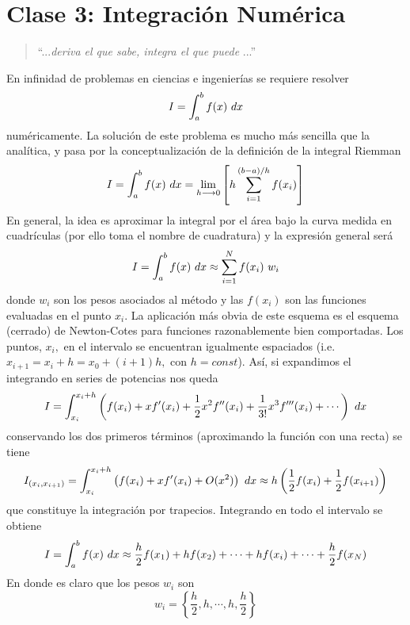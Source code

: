 \documentclass[spanish,titlepage,11pt]{article}
\begin{document}
\section{\textbf{Clase 3: }Integraci\'{o}n Num\'{e}rica}

\begin{quotation}
``...\textit{deriva el que sabe, integra el que puede} ...''
\end{quotation}

En infinidad de problemas en ciencias e ingenier\'{i}as se requiere resolver
\begin{equation}
I=\int_{a}^{b}f(x)\ {\normalsize d}x
\end{equation}
num\'{e}ricamente. La soluci\'{o}n de este problema es mucho m\'{a}s sencilla
que la anal\'{i}tica, y pasa por la conceptualizaci\'{o}n de la definici\'{o}n
de la integral Riemman
\begin{equation}
I=\int_{a}^{b}f(x)\ {\normalsize d}x=\lim_{h\longrightarrow0}\left[
h\sum_{i=1}^{\left(  b-a\right)  /h}f(x_{i})\right]
\end{equation}
En general, la idea es aproximar la integral por el \'{a}rea bajo la curva
medida en cuadr\'{i}culas (por ello toma el nombre de cuadratura) y la
expresi\'{o}n general ser\'{a}
\begin{equation}
I=\int_{a}^{b}f(x)\ {\normalsize d}x\approx\sum_{i=1}^{N}f(x_{i}%
)\ w_{i}\label{intaprox}%
\end{equation}
donde $w_{i}$ son los pesos asociados al m\'{e}todo y las $f(x_{i})$ son las
funciones evaluadas en el punto $x_{i}.$ La aplicaci\'{o}n m\'{a}s obvia de
este esquema es el esquema (cerrado) de Newton-Cotes para funciones
razonablemente bien comportadas. Los puntos, $x_{i},$ en el intervalo se
encuentran igualmente espaciados (i.e. $x_{i+1}=x_{i}+h=x_{0}+\left(
i+1\right)  h,$ con $h=const$). As\'{i}, si expandimos el integrando en series
de potencias nos queda
\begin{equation}
I=\int_{x_{i}}^{x_{i}+h}\left(  f(x_{i})+xf^{\prime}(x_{i})+\dfrac{1}{2}%
x^{2}f^{\prime\prime}(x_{i})+\dfrac{1}{3!}x^{3}f^{\prime\prime\prime}%
(x_{i})+\cdots\right)  \ {\normalsize d}x
\end{equation}
conservando los dos primeros t\'{e}rminos (aproximando la funci\'{o}n con una
recta) se tiene
\begin{equation}
I_{\left(  x_{i},x_{i+1}\right)  }=\int_{x_{i}}^{x_{i}+h}\left(
f(x_{i})+xf^{\prime}(x_{i})+O(x^{2})\right)  \ {\normalsize d}x\approx
h\left(  \dfrac{1}{2}f(x_{i})+\dfrac{1}{2}f(x_{i+1})\right)
\end{equation}
que constituye la integraci\'{o}n por trapecios. Integrando en todo el
intervalo se obtiene
\begin{equation}
I=\int_{a}^{b}f(x)\ {\normalsize d}x\approx\dfrac{h}{2}f(x_{1})+hf(x_{2}%
)+\cdots+hf(x_{i})+\cdots+\dfrac{h}{2}f(x_{N})
\end{equation}
En donde es claro que los pesos $w_{i}$ son
\begin{equation}
w_{i}=\left\{  \dfrac{h}{2},h,\cdots,h,\dfrac{h}{2}\right\}
\end{equation}%
\end{document}
